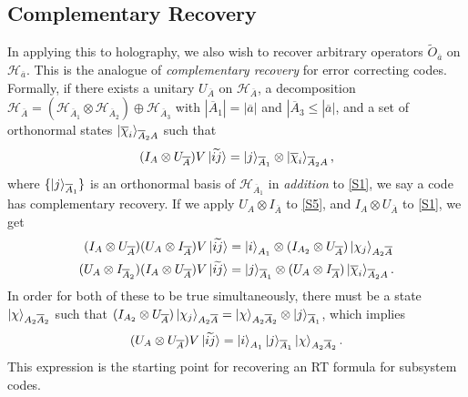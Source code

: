 \documentclass[12pt,a4paper]{report}
\numberwithin{equation}{section}
\newcommand{\ol}[1]{\overline{#1}}
\theoremstyle{definition}
\theoremstyle{theorem}
\theoremstyle{theorem}
\theoremstyle{example}
\theoremstyle{definition}
\begin{document}
\subsection{Complementary Recovery}
In applying this to holography, we also wish to recover arbitrary operators $\tilde{O}_{\ol{a}}$ on $\mathcal{H}_{\ol{a}}$. This is the analogue of \textit{complementary recovery} for error correcting codes. Formally, if there exists a unitary $U_{\ol{A}}$ on $\mathcal{H}_{\ol{A}}$, a decomposition $\mathcal{H}_{\ol{A}}=(\mathcal{H}_{\ol{A}_{1}}\otimes\mathcal{H}_{\ol{A}_{2}})\oplus\mathcal{H}_{\ol{A}_{3}}$ with $|\ol{A}_{1}|=|\ol{a}|$ and $|\ol{A}_{3}\leq|\ol{a}|$, and a set of orthonormal states $\ket{\ol{\chi}_{i}}_{\ol{A}_{2}A}$ such that
\begin{equation}\label{S5}
	(I_{A}\otimes U_{\ol{A}})V\ket{\widetilde{ij}}=\ket{j}_{\ol{A}_{1}}\otimes\ket{\ol{\chi}_{i}}_{\ol{A}_{2}A},
\end{equation}
where $\{\ket{j}_{\ol{A}_{1}}\}$ is an orthonormal basis of $\mathcal{H}_{\ol{A}_{1}}$ in \textit{addition} to \ref{S1}, we say a code has complementary recovery. If we apply $U_{A}\otimes I_{\ol{A}}$ to \ref{S5}, and $I_{A}\otimes U_{\ol{A}}$ to \ref{S1}, we get
\begin{equation}
	\begin{aligned}
		(I_{A}\otimes U_{\ol{A}})(U_{A}\otimes I_{\ol{A}})V\ket{\widetilde{ij}}&=\ket{i}_{A_{1}}\otimes (I_{A_{2}}\otimes U_{\ol{A}})\ket{\chi_{j}}_{A_{2}\ol{A}}\\
		(U_{A}\otimes I_{\ol{A}_{2}})(I_{A}\otimes U_{\ol{A}})V\ket{\widetilde{ij}}&=\ket{j}_{\ol{A}_{1}}\otimes (U_{A}\otimes I_{\ol{A}})\ket{\ol{\chi}_{i}}_{\ol{A}_{2}A}.
	\end{aligned}
\end{equation}
In order for both of these to be true simultaneously, there must be a state $\ket{\chi}_{A_{2}\ol{A}_{2}}$ such that
$(I_{A_{2}}\otimes U_{\ol{A}})\ket{\chi_{j}}_{A_{2}\ol{A}}=\ket{\chi}_{A_{2}\ol{A}_{2}}\otimes\ket{j}_{\ol{A}_{1}}$, which implies
\begin{equation}
	(U_{A}\otimes U_{\ol{A}})V\ket{\widetilde{ij}}=\ket{i}_{A_{1}}\ket{j}_{\ol{A}_{1}}\ket{\chi}_{A_{2}\ol{A}_{2}}.
\end{equation}
This expression is the starting point for recovering an RT formula for subsystem codes.
\end{document}
